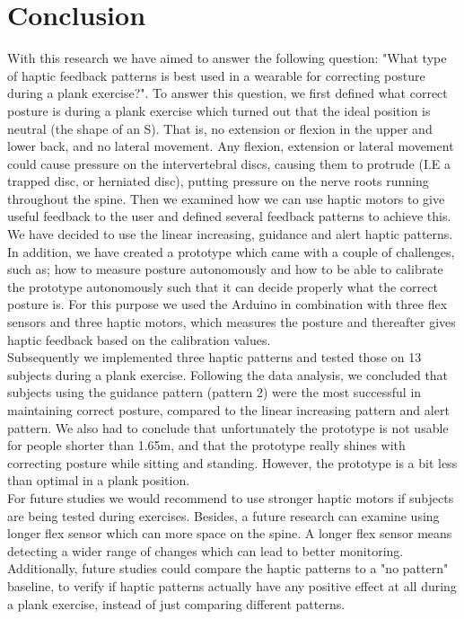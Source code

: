 \documentclass[sigconf]{acmart}
\begin{document}
\section{Conclusion}

With this research we have aimed to answer the following question: "What type of haptic feedback patterns is best used in a wearable for correcting posture during a plank exercise?".  
To answer this question, we first defined what correct posture is during a plank exercise which turned out that the ideal position is neutral (the shape of an S). That is, no extension or flexion in the upper and lower back, and no lateral movement. Any flexion, extension or lateral movement could cause pressure on the intervertebral discs, causing them to protrude (I.E a trapped disc, or herniated disc), putting pressure on the nerve roots running throughout the spine. 
Then we examined how we can use haptic motors to give useful feedback to the user and defined several feedback patterns to achieve this. We have decided to use the linear increasing, guidance and alert haptic patterns.  
In addition, we have created a prototype which came with a couple of challenges, such as; how to measure posture autonomously and how to be able to calibrate the prototype autonomously such that it can decide properly what the correct posture is. For this purpose we used the Arduino in combination with three flex sensors and three haptic motors, which measures the posture and thereafter gives haptic feedback based on the calibration values.\\  
Subsequently we implemented three haptic patterns and tested those on 13 subjects during a plank exercise. Following the data analysis, we concluded that subjects using the guidance pattern (pattern 2) were the most successful in maintaining correct posture, compared to the linear increasing pattern and alert pattern. We also had to conclude that unfortunately the prototype is not usable for people shorter than 1.65m, and that the prototype really shines with correcting posture while sitting and standing. However, the prototype is a bit less than optimal in a plank position. \\
For future studies we would recommend to use stronger haptic motors if subjects are being tested during exercises. Besides, a future research can examine using longer flex sensor which can more space on the spine. A longer flex sensor means detecting a wider range of changes which can lead to better monitoring. Additionally, future studies could compare the haptic patterns to a "no pattern" baseline, to verify if haptic patterns actually have any positive effect at all during a plank exercise, instead of just comparing different patterns.
\end{document}
